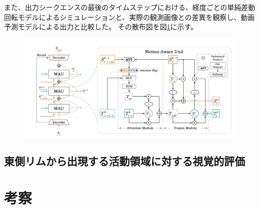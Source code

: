           また、出力シークエンスの最後のタイムステップにおける、経度ごとの単純差動回転モデルによるシミュレーションと、実際の観測画像との差異を観察し、動画予測モデルによる出力と比較した。
          その散布図を図\ref{fig:exp1_sdr_longitude_scatter}に示す。
          \begin{figure}[htbp]
            \centering
            \includegraphics[width=\textwidth]{figures/mau.png}
            \caption{}
            \label{fig:exp1_sdr_longitude_scatter}
          \end{figure}

    \subsection{東側リムから出現する活動領域に対する視覚的評価}
  \section{考察}
